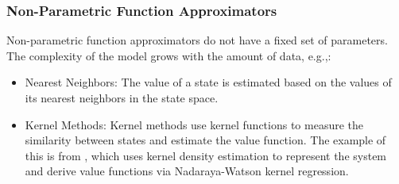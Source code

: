 \subsubsection{Non-Parametric Function Approximators}
Non-parametric function approximators do not have a fixed set of parameters. The complexity of the model grows with the amount of data, e.g.,:
\begin{itemize}
    \item Nearest Neighbors: The value of a state is estimated based on the values of its nearest neighbors in the state space.
    \item Kernel Methods: Kernel methods use kernel functions to measure the similarity between states and estimate the value function. The example of this is from \cite{Kroemer2011}, which uses kernel density estimation to represent the system and derive value functions via Nadaraya-Watson kernel regression.
\end{itemize}

